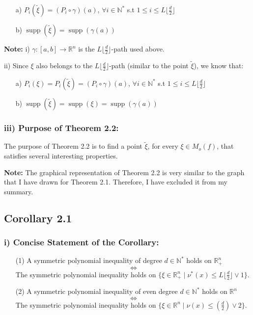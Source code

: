 \documentclass[12pt]{article}
\theoremstyle{definition}
\DeclareMathOperator{\supp}{supp}
\begin{document}
\begin{enumerate}
\item[a)] $P_i(\tilde{\xi}) = (P_i \circ \gamma)(a)$, $\forall i \in \mathbb{N}^*$ s.t $1 \leq i \leq L\lfloor \frac{d}{2} \rfloor$
\item[b)] $\supp(\tilde{\xi}) = \supp(\gamma(a))$
\end{enumerate}

\textbf{Note:} i) $\gamma: [a,b] \to \mathbb{R}^n$ is the $L\lfloor \frac{d}{2} \rfloor$-path used above.

\hspace{1.3cm} ii) Since $\xi$ also belongs to the $L\lfloor \frac{d}{2} \rfloor$-path (similar to the point $\tilde{\xi}$), we know that:
\begin{enumerate}
\item[a)] $P_i(\xi) = P_i(\tilde{\xi}) = (P_i \circ \gamma)(a)$, $\forall i \in \mathbb{N}^*$ s.t $1 \leq i \leq L\lfloor \frac{d}{2} \rfloor$
\item[b)] $\supp(\tilde{\xi}) = \supp(\xi) = \supp(\gamma(a))$
\end{enumerate}

\subsubsection*{iii) Purpose of Theorem 2.2:}

The purpose of Theorem 2.2 is to find a point $\tilde{\xi}$, for every $\xi \in M_o(f)$, that satisfies several interesting properties.

\textbf{Note:} The graphical representation of Theorem 2.2 is very similar to the graph that I have drawn for Theorem 2.1. Therefore, I have excluded it from my summary.

\newpage

\subsection{Corollary 2.1}

\subsubsection*{i) Concise Statement of the Corollary:}

\begin{enumerate}
\item[(1)] A symmetric polynomial inequality of degree $d \in \mathbb{N}^*$ holds on $\mathbb{R}_+^n$ 
\[
\Longleftrightarrow
\]
The symmetric polynomial inequality holds on $\{\xi \in \mathbb{R}_+^n \mid \nu^*(x) \leq L\lfloor \frac{d}{2} \rfloor \vee 1\}$.

\item[(2)] A symmetric polynomial inequality of even degree $d \in \mathbb{N}^*$ holds on $\mathbb{R}^n$ 
\[
\Longleftrightarrow
\]
The symmetric polynomial inequality holds on $\{\xi \in \mathbb{R}^n \mid \nu(x) \leq (\frac{d}{2}) \vee 2\}$.
\end{enumerate}
\end{document}
